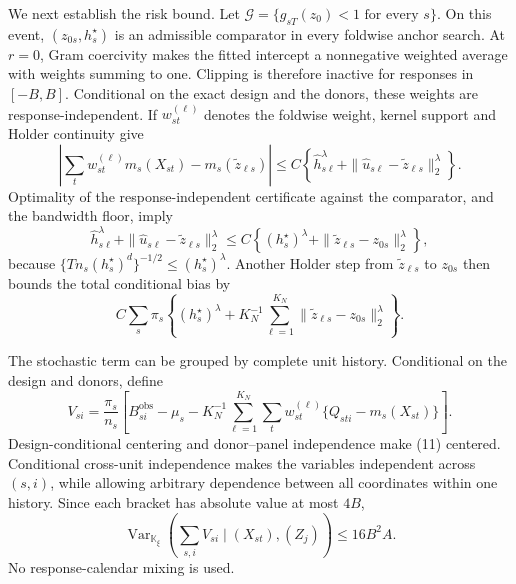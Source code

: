 We next establish the risk bound.  Let
\(\mathcal G=\{g_{sT}(z_0)<1\text{ for every }s\}\).  On this event,
\((z_{0s},h_s^\star)\) is an admissible comparator in every foldwise
anchor search.  At \(r=0\), Gram coercivity makes the fitted intercept a
nonnegative weighted average with weights summing to one.  Clipping is
therefore inactive for responses in \([-B,B]\).  Conditional on the exact
design and the donors, these weights are response-independent.  If
\(w_{st}^{(\ell)}\) denotes the foldwise weight, kernel support and Holder
continuity give
\[
 \left|\sum_tw_{st}^{(\ell)}m_s(X_{st})
       -m_s(\widetilde z_{\ell s})\right|
 \le C\left\{\widehat h_{s\ell}^{\lambda}
       +\|\widehat u_{s\ell}-\widetilde z_{\ell s}\|_2^\lambda\right\}.
                                                                    \tag{8}
\]
Optimality of the response-independent certificate against the comparator,
and the bandwidth floor, imply
\[
 \widehat h_{s\ell}^{\lambda}
 +\|\widehat u_{s\ell}-\widetilde z_{\ell s}\|_2^\lambda
 \le C\left\{(h_s^\star)^\lambda
       +\|\widetilde z_{\ell s}-z_{0s}\|_2^\lambda\right\},       \tag{9}
\]
because
\(\{Tn_s(h_s^\star)^d\}^{-1/2}\le(h_s^\star)^\lambda\).
Another Holder step from \(\widetilde z_{\ell s}\) to \(z_{0s}\) then
bounds the total conditional bias by
\[
 C\sum_s\pi_s\left\{(h_s^\star)^\lambda
 +K_N^{-1}\sum_{\ell=1}^{K_N}
   \|\widetilde z_{\ell s}-z_{0s}\|_2^\lambda\right\}.          \tag{10}
\]

The stochastic term can be grouped by complete unit history.  Conditional
on the design and donors, define
\[
 V_{si}=\frac{\pi_s}{n_s}\left[
 B_{si}^{\mathrm{obs}}-\mu_s
 -K_N^{-1}\sum_{\ell=1}^{K_N}\sum_t w_{st}^{(\ell)}
       \{Q_{sti}-m_s(X_{st})\}\right].                          \tag{11}
\]
Design-conditional centering and donor--panel independence make (11)
centered.  Conditional cross-unit independence makes the variables
independent across \((s,i)\), while allowing arbitrary dependence between
all coordinates within one history.  Since each bracket has absolute value
at most \(4B\),
\[
 \operatorname{Var}_{\mathbb K_\xi}
 \left(\sum_{s,i}V_{si}\mid(X_{st}),(Z_j)\right)
 \le16B^2A.                                                     \tag{12}
\]
No response-calendar mixing is used.

